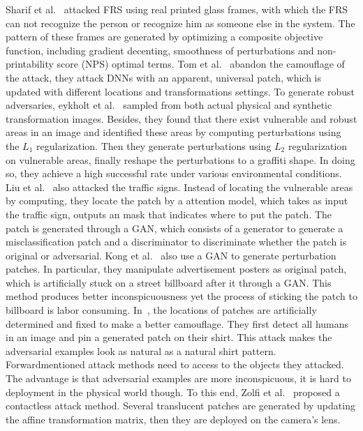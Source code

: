 \documentclass[10pt,twocolumn,letterpaper]{article}
\begin{document}
Sharif et al.~\cite{Sharif_2017_CCS} attacked FRS using real 
printed glass frames, 
with which the FRS can not recognize the person or recognize him
as someone else in the system. The pattern of these frames are 
generated by optimizing a composite objective function, 
including gradient decenting, smoothness of perturbations and 
non-printability score (NPS) optimal terms.
Tom et al.~\cite{Brown_2017_arxiv} abandon the camouflage of the attack, 
they attack DNNs with an apparent, universal patch, 
which is updated with different locations and transformations settings.
To generate robust adversaries, 
eykholt et al.~\cite{Eykholt_2018_CVPR} sampled from both 
actual physical and synthetic transformation images. Besides,
they found that there exist vulnerable and robust areas in an 
image and identified these areas by computing perturbations 
using the $L_1$ regularization. Then they generate perturbations 
using $L_2$ regularization on vulnerable areas, finally reshape 
the perturbations to a graffiti shape. In doing so, they achieve 
a high successful rate under various environmental conditions.
Liu et al.~\cite{Liu_2019_AAAI} also attacked the traffic signs. 
Instead of 
locating the vulnerable areas by computing, they locate 
the patch by a attention model, which takes as input the 
traffic sign, outputs an mask that indicates where to put the patch. 
The patch is generated through a GAN, which consists of a generator 
to generate a misclassification patch and a discriminator 
to discriminate whether the patch is original or adversarial. 
Kong et al.~\cite{Kong_2020_CVPR} also use a GAN to generate 
perturbation patches. 
In particular, they manipulate advertisement posters as original patch, 
which is artificially stuck on a street billboard after it 
through a GAN. This method produces better inconspicuousness yet 
the process of sticking the patch to billboard is labor consuming.
In~\cite{Hu_2021_ICCV}, the locations of patches are artificially 
determined and fixed
to make a better camouflage.
They first detect all humans in an image and pin a generated patch 
on their shirt. This attack makes the adversarial examples look as 
natural as a natural shirt pattern.
Forwardmentioned attack methods need to access to the objects they 
attacked. The advantage is that adversarial examples are more 
inconspicuous, it is hard to deployment in the physical world though. 
To this end, Zolfi et al.~\cite{Zolfi_2021_CVPR} proposed 
a contactless attack method. 
Several translucent patches are generated by updating the affine 
transformation matrix, then they are deployed on the camera's lens.
\end{document}
